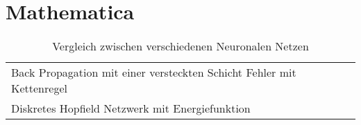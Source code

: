 \section{Mathematica}
\begin{table}[!h]
	\begin{tabularx}{\textwidth}{p{6cm} X}
		Back Propagation mit einer versteckten Schicht Fehler mit Kettenregel &
		\vspace{-5mm}
		 \\
		Diskretes Hopfield Netzwerk mit Energiefunktion &
		\vspace{-5mm}
		
	\end{tabularx}
	\caption{Vergleich zwischen verschiedenen Neuronalen Netzen}
	\label{tab:mathematica}
\end{table}

